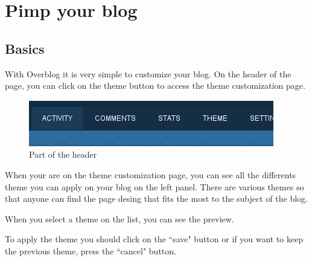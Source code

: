 \documentclass[a4paper,10pt]{article}
\begin{document}
\newpage

\section{Pimp your blog}
\subsection{Basics}

With Overblog it is very simple to customize your blog. On the header of the page, you can click on the theme button to access the theme customization page.

\begin{figure}[htpb]
 \centering
 \includegraphics[scale=0.43]{Images/HeaderBar.png}
 \caption{Part of the header}
 \label{customHeader}
\end{figure}

When your are on the theme customization page, you can see all the differents theme you can apply on your blog on the left panel. 
There are various themes so that anyone can find the page desing that fits the most to the subject of the blog. 

When you select a theme on the list, you can see the preview. 

To apply the theme you should click on the ``save" button 
or if you want to keep the previous theme, press the ``cancel" button.
\end{document}
